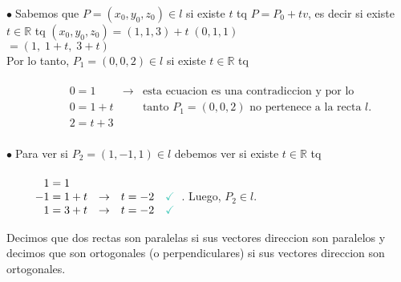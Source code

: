\documentclass{article}
\theoremstyle{definition}
\theoremstyle{remark}
\newcommand\bl{$\bullet\;$}
\newcommand\ok{\checkmark}
\begin{document}
\bl Sabemos que $P=(x_0,y_0,z_0) \in l$ si existe $t$ tq $P=P_0 + tv$, es decir si existe $t \in \mathbb{R}$ tq \quad $(x_0,y_0,z_0)$\;$=(1,1,3)+t \; (0,1,1)$\\
\;$= (1,\; 1+t,\; 3+t)$ \\
Por lo tanto, $P_1=(0,0,2) \in l$ si existe $t \in \mathbb{R}$ tq  \\\\$
  \quad \quad \begin{array}{llc}
  \quad \quad \phantom{-} 0 =1  & \to & \text{esta ecuacion es una contradiccion y por lo}\\
  \quad \quad \phantom{-} 0 = 1 + t & & \text{tanto $P_1=(0,0,2)$ no pertenece a la recta $l$}.\\ 
 \quad \quad \phantom{-}2 = t+3
    \end{array}
$ \\\\
\bl Para ver si $P_2=(1,-1,1) \in l $ debemos ver si existe $t \in \mathbb{R}$ tq \\\\
$\begin{array}{llc}
 \quad \quad \phantom{-}1 = 1 & & \\
 \quad \quad   -1 = 1+t & \to & t=-2 \quad \textcolor{verdep2}{\ok} \\
  \quad \quad  \phantom{-}1 = 3+t & \to & t=-2 \quad \textcolor{verdep2}{\ok} \\
\end{array}$. Luego, $P_2 \in l$.
\pagebreak
\begin{defi}
  Decimos que dos rectas son paralelas si sus vectores direccion son paralelos y decimos que son ortogonales (o perpendiculares) si sus vectores direccion son ortogonales. 
\end{defi}
\end{document}
